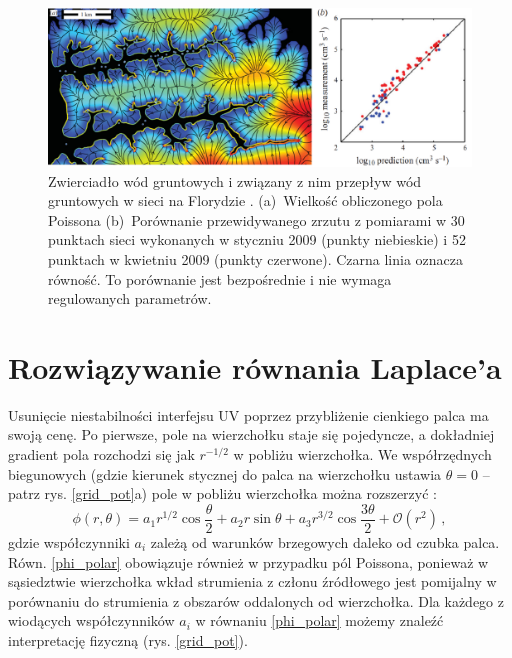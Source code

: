 \documentclass[]{pracamgr}
\begin{document}
    \begin{figure}[H]
      \centering
      \includegraphics[width=\textwidth]{figs/potencjal_floryda_przewidywania.png}
      \caption{ Zwierciadło wód gruntowych i związany z nim przepływ wód gruntowych w sieci na Florydzie \cite{petroff2011geometry}. (a)~Wielkość obliczonego pola Poissona (b)~Porównanie przewidywanego zrzutu z pomiarami w 30 punktach sieci wykonanych w styczniu 2009 (punkty niebieskie) i 52 punktach w kwietniu 2009 (punkty czerwone). Czarna linia oznacza równość. To porównanie jest bezpośrednie i nie wymaga regulowanych parametrów.}
      \label{potencjal_floryda}
    \end{figure}



  \chapter{Rozwiązywanie równania Laplace'a}\label{chapter:solving}
    
    Usunięcie niestabilności interfejsu UV poprzez przybliżenie cienkiego palca ma swoją cenę. Po pierwsze, pole na wierzchołku staje się pojedyncze, a dokładniej gradient pola rozchodzi się jak $r^{-1/2}$ w pobliżu wierzchołka. We współrzędnych biegunowych (gdzie kierunek stycznej do palca na wierzchołku ustawia $\theta = 0$ -- patrz rys. \ref{grid_pot}a) pole w pobliżu wierzchołka można rozszerzyć \cite{derrida1992needle , petroff2013bifurcation}:
    \begin{equation}\label{phi_polar}
      \phi(r,\theta)=a_1r^{1/2}\cos\frac{\theta}{2}+a_2r \sin \theta+a_3 r^{3/2} \cos\frac{3\theta}{2}+\mathcal{O}\left(r^2\right) \,,
    \end{equation}
    gdzie współczynniki $a_i$ zależą od warunków brzegowych daleko od czubka palca. Równ. \eqref{phi_polar} obowiązuje również w przypadku pól Poissona, ponieważ w sąsiedztwie wierzchołka wkład strumienia z członu źródłowego jest pomijalny w porównaniu do strumienia z obszarów oddalonych od wierzchołka. Dla każdego z wiodących współczynników $a_i$ w równaniu \eqref{phi_polar} możemy znaleźć interpretację fizyczną (rys. \ref{grid_pot}).
\end{document}
